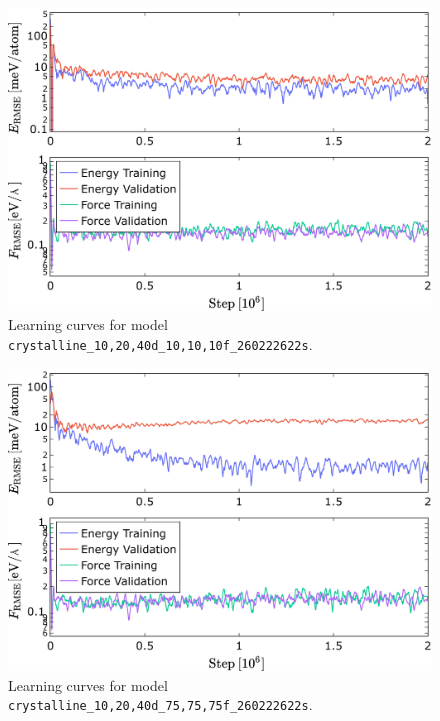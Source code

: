 \begin{figure}
  \begin{center}
    \includegraphics[width=.8\textwidth]{
      asset/crystalline_10,20,40d_10,10,10f_260222622s_energy_force_l_curve.jpg
    }
  \end{center}
  \caption{Learning curves for model \texttt{crystalline\_10,20,40d\_10,10,\allowbreak{}10f\_260222622s}.}
  \label{fig:crystalline_10,20,40d_10,10,10f_260222622s-learning-curves}
\end{figure}

\begin{figure}
  \begin{center}
    \includegraphics[width=.8\textwidth]{
      asset/crystalline_10,20,40d_75,75,75f_260222622s_energy_force_l_curve.jpg
    }
  \end{center}
  \caption{Learning curves for model \texttt{crystalline\_10,20,40d\_75,75,\allowbreak{}75f\_260222622s}.}
  \label{fig:crystalline_10,20,40d_75,75,75f_260222622s-learning-curves}
\end{figure}

